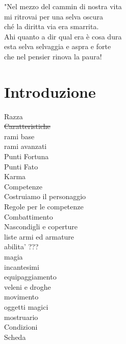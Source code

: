 \documentclass[12pt,a4paper,twoside,openany]{book}
\begin{document}

\pagebreak

\setcounter{page}{1}

\begin{multicols}{2}
\tableofcontents{}

\end{multicols}

\vfill

\begin{changemargin}{0.3cm}{0.3cm}\begin{tcolorbox}
"Nel mezzo del cammin di nostra vita\\
mi ritrovai per una selva oscura\\
ché la diritta via era smarrita.\\
Ahi quanto a dir qual era è cosa dura\\
esta selva selvaggia e aspra e forte\\
che nel pensier rinova la paura!\\
\end{tcolorbox}\end{changemargin}

\pagebreak

\section{Introduzione}
Razza\\
\sout{Caratteristiche}\\
rami base\\
rami avanzati\\
Punti Fortuna\\
Punti Fato\\
Karma\\
Competenze\\
Costruiamo il personaggio\\
Regole per le competenze\\
Combattimento\\
Nascondigli e coperture\\
liste armi ed armature\\
abilita' ???\\
magia\\
incantesimi\\
equipaggiamento\\
veleni e droghe\\
movimento\\
oggetti magici\\
mostruario\\
Condizioni\\
Scheda\\
\end{document}
